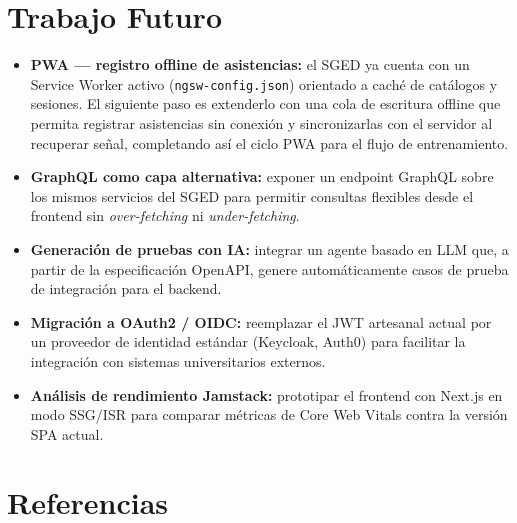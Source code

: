 \documentclass[12pt,a4paper]{article}
\begin{document}
\section{Trabajo Futuro}
\label{sec:futuro}

\begin{itemize}
  \item \textbf{PWA --- registro offline de asistencias:} el SGED ya cuenta con un
    Service Worker activo (\texttt{ngsw-config.json}) orientado a caché de catálogos
    y sesiones. El siguiente paso es extenderlo con una cola de escritura offline que
    permita registrar asistencias sin conexión y sincronizarlas con el servidor al
    recuperar señal, completando así el ciclo PWA para el flujo de entrenamiento.
  \item \textbf{GraphQL como capa alternativa:} exponer un endpoint GraphQL sobre los
    mismos servicios del SGED para permitir consultas flexibles desde el frontend sin
    \textit{over-fetching} ni \textit{under-fetching}.
  \item \textbf{Generación de pruebas con IA:} integrar un agente basado en LLM que,
    a partir de la especificación OpenAPI, genere automáticamente casos de prueba de
    integración para el backend.
  \item \textbf{Migración a OAuth2 / OIDC:} reemplazar el JWT artesanal actual por un
    proveedor de identidad estándar (Keycloak, Auth0) para facilitar la integración con
    sistemas universitarios externos.
  \item \textbf{Análisis de rendimiento Jamstack:} prototipar el frontend con Next.js en
    modo SSG/ISR para comparar métricas de Core Web Vitals contra la versión SPA actual.
\end{itemize}

\newpage
\section*{Referencias}

\printbibliography[heading=none]

\appendix
\end{document}
